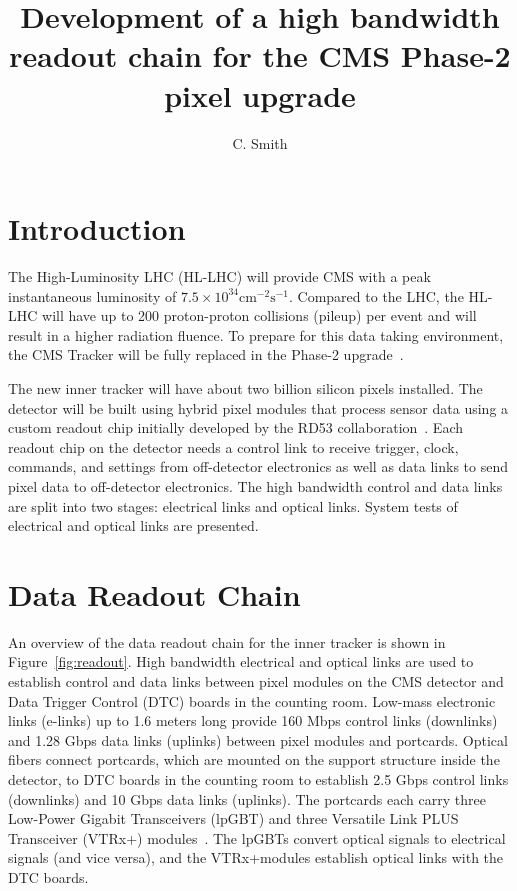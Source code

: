 \documentclass[a4paper,11pt]{article}
\title{Development of a high bandwidth readout chain for the CMS Phase-2 pixel upgrade}
\author{C. Smith}
\affiliation{The University of Kansas,\\Lawrence, Kansas 66045, USA}
\newcommand{\vtrxp}{VTRx+}
\newcommand{\fig}{Figure}
\begin{document}
\maketitle
\flushbottom


\section{Introduction}
\label{sec:introduction}

The High-Luminosity LHC (HL-LHC) will provide CMS with a peak instantaneous luminosity of $7.5 \times 10^{34} \mathrm{cm}^{-2} \mathrm{s}^{-1}$.
Compared to the LHC, the HL-LHC will have up to 200 proton-proton collisions (pileup) per event and will result in a higher radiation fluence.
To prepare for this data taking environment, the CMS Tracker will be fully replaced in the Phase-2 upgrade~\cite{ref:tdr,ref:orfanelli}.

The new inner tracker will have about two billion silicon pixels installed.
The detector will be built using hybrid pixel modules that process sensor data using a custom readout chip initially developed by the RD53 collaboration~\cite{ref:rd53}.
Each readout chip on the detector needs a control link to receive trigger, clock, commands, and settings from off-detector electronics as well as data links to send pixel data to off-detector electronics.
The high bandwidth control and data links are split into two stages: electrical links and optical links.
System tests of electrical and optical links are presented.

\section{Data Readout Chain}
\label{sec:readout}

An overview of the data readout chain for the inner tracker is shown in \fig~\ref{fig:readout}.
High bandwidth electrical and optical links are used to establish control and data links between pixel modules on the CMS detector and Data Trigger Control (DTC) boards in the counting room.
Low-mass electronic links (e-links) up to 1.6 meters long provide 160 Mbps control links (downlinks) and 1.28 Gbps data links (uplinks) between pixel modules and portcards.
Optical fibers connect portcards, which are mounted on the support structure inside the detector, to DTC boards in the counting room to establish 2.5 Gbps control links (downlinks) and 10 Gbps data links (uplinks).
The portcards each carry three Low-Power Gigabit Transceivers (lpGBT) and three Versatile Link PLUS Transceiver (\vtrxp) modules~\cite{ref:lpgbt_1,ref:vtrxp}.
The lpGBTs convert optical signals to electrical signals (and vice versa), and the \vtrxp\space modules establish optical links with the DTC boards.
\end{document}
